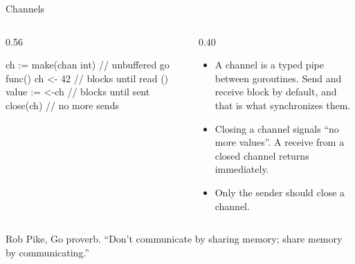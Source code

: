 \documentclass[10pt,aspectratio=169,t]{beamer}
\begin{document}
\begin{frame}[fragile,eyebrow=Goroutines]{Channels}
  \begin{columns}[T]
    \begin{column}{0.56\textwidth}
\begin{golang}
ch := make(chan int) // unbuffered
go func() {
    ch <- 42 // blocks until read
}()
value := <-ch // blocks until sent
close(ch) // no more sends
\end{golang}
    \end{column}
    \begin{column}{0.40\textwidth}
      \begin{itemize}
        \item A channel is a typed pipe between goroutines. Send and receive block by default, and that is what synchronizes them.
        \item Closing a channel signals ``no more values''. A receive from a closed channel returns immediately.
        \item Only the sender should close a channel.
      \end{itemize}
    \end{column}
  \end{columns}
  \begin{takeaway}{Rob Pike, Go proverb.}
    ``Don't communicate by sharing memory; share memory by communicating.''
  \end{takeaway}
\end{frame}
\end{document}
